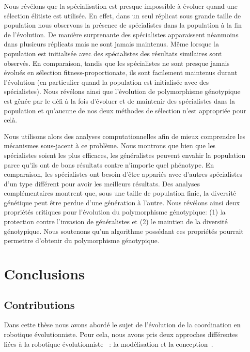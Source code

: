 			Nous révélons que la spécialisation est presque impossible à évoluer quand une sélection élitiste est utilisée. En effet, dans un seul réplicat sous grande taille de population nous observons la présence de spécialistes dans la population à la fin de l'évolution. De manière surprenante des spécialistes apparaissent néanmoins dans plusieurs réplicats mais ne sont jamais maintenus. Même lorsque la population est initialisée avec des spécialistes des résultats similaires sont observés. En comparaison, tandis que les spécialistes ne sont presque jamais évolués en sélection fitness-proportionate, ils sont facilement maintenus durant l'évolution (en particulier quand la population est initialisée avec des spécialistes). Nous révélons ainsi que l'évolution de polymorphisme génotypique est gênée par le défi à la fois d'évoluer et de maintenir des spécialistes dans la population et qu'aucune de nos deux méthodes de sélection n'est appropriée pour celà.

			Nous utilisons alors des analyses computationnelles afin de mieux comprendre les mécanismes sous-jacent à ce problème. Nous montrons que bien que les spécialistes soient les plus efficaces, les généralistes peuvent envahir la population parce qu'ils ont de bons résultats contre n'importe quel phénotype. En comparaison, les spécialistes ont besoin d'être appariés avec d'autres spécialistes d'un type différent pour avoir les meilleurs résultats. Des analyses complémentaires montrent que, sous une taille de population finie, la diversité génétique peut être perdue d'une génération à l'autre. Nous révélons ainsi deux propriétés critiques pour l'évolution du polymorphisme génotypique: (1) la protection contre l'invasion de généralistes et (2) le maintien de la diversité génotypique. Nous soutenons qu'un algorithme possédant ces propriétés pourrait permettre d'obtenir du polymorphisme génotypique.


\section{Conclusions}

	\subsection{Contributions}

		Dans cette thèse nous avons abordé le sujet de l'évolution de la coordination en robotique évolutionniste. Pour cela, nous avons pris deux approches différentes liées à la robotique évolutionniste~\parencite{Nolfi2000, Doncieux2015a} : la modélisation et la conception~\parencite{Trianni2014b}.

